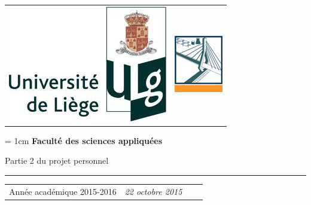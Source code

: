 \documentclass[a4paper, 11pt]{article}
\begin{document}

\begin{titlepage}
	
	
	\begin{tabular}{p{11cm}p{8cm}}    
		\includegraphics[scale=0.4]{Fig/logo_ulg.png}  &\raggedright{\includegraphics[scale=0.6]{Fig/Logo_FSAnew.png}}\\
	\end{tabular}
	
	\begin{center}
		\unitlength = 1cm
		\vspace{0.1cm}
		\Large\textbf{Faculté des sciences appliquées}\\
		\vspace{2.5cm}
		\Large  {}
		\vspace*{2.3cm}
		\huge
		\begin{center}
			Partie 2 du projet personnel
			\rule{13cm}{0.5mm}
		\end{center}
	\end{center}
	
	\vspace*{5.5cm}
	
	\vspace*{4cm}
	
	
	\begin{tabular}{p{14cm}p{15cm} l r}    
		Année académique 2015-2016 
		&\raggedright{\large \noindent \textsl{22 octobre 2015}}
	\end{tabular}
\end{titlepage}
   \setcounter{page}{1}
\end{document}

